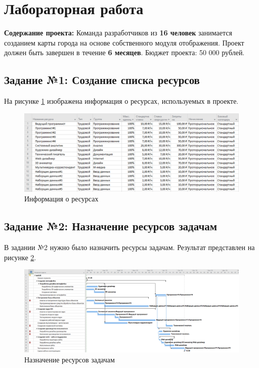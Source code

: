 \section*{Лабораторная работа}
\textbf{Содержание проекта:} Команда разработчиков из \textbf{16 человек} занимается созданием карты города на основе собственного модуля отображения. Проект должен быть завершен в течение \textbf{6 месяцев}. Бюджет проекта: 50 000 рублей.

\subsection*{Задание №1: Создание списка ресурсов}

На рисунке \ref{p4} изображена информация о ресурсах, используемых в проекте.
\begin{figure}[!h]
	\centering
	\includegraphics[width=1\linewidth]{inc/img/4.png}
	\caption{Информация о ресурсах}
	\label{p4}
\end{figure}

\newpage
\subsection*{Задание №2: Назначение ресурсов задачам}
В задании №2 нужно было назначить ресурсы задачам. Результат представлен на рисунке \ref{p5}.
\begin{figure}[!h]
	\centering
	\includegraphics[width=1\linewidth]{inc/img/5.png}
	\caption{Назначение ресурсов задачам}
	\label{p5}
\end{figure}

